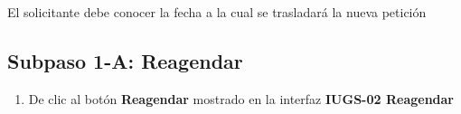 El solicitante debe conocer la fecha a la cual se trasladará la nueva
petición

\subsection{Subpaso 1-A: Reagendar}
\begin{enumerate}
	\item De clic al botón  \textbf{Reagendar} mostrado en la interfaz  \textbf{IUGS-02 Reagendar}
\end{enumerate}